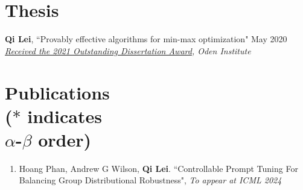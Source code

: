\documentclass[margin, 10pt]{res} %
\begin{document}
\begin{resume}
\begin{itemize}[noitemsep]
\end{itemize}








\section{Thesis} 
\textbf{Qi Lei}, ``Provably effective algorithms for min-max optimization" \hfill{May 2020} \\ 
\textit{\href{https://www.oden.utexas.edu/news-and-events/news/Oden-Institute-Outstanding-Dissertation-Award-Winner-2021/}{Received the 2021 Outstanding Dissertation Award}, Oden Institute}

\newpage
\section{Publications\\
	\vspace{4pt}
{\footnotesize ($*$ indicates\\ $\alpha$-$\beta$ order) }}
\begin{enumerate}
\item{Hoang Phan, Andrew G Wilson, \textbf{Qi Lei}. ``Controllable Prompt Tuning For Balancing Group Distributional Robustness", \textit{To appear at ICML 2024}}


\end{enumerate}
\end{resume}
\end{document}
